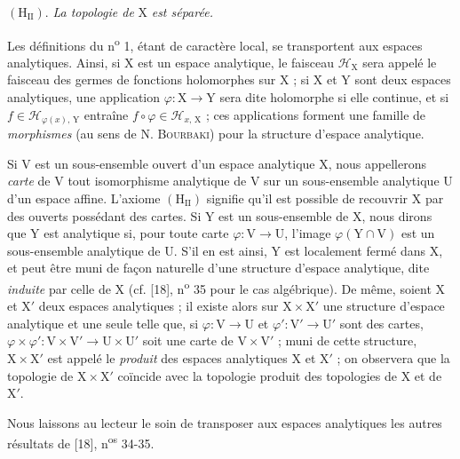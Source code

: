 $(\mathrm{H}_{\mathrm{II}})$. \emph{La topologie de} $\mathrm{X}$ \emph{est séparée.}

Les définitions du n\textsuperscript{o} 1, étant de caractère local, se transportent aux espaces analytiques. Ainsi, si $\mathrm{X}$ est un espace analytique, le faisceau $\mathcal{H}_{\mathrm{X}}$ sera appelé le faisceau des germes de fonctions holomorphes sur $\mathrm{X}$ ; si $\mathrm{X}$ et $\mathrm{Y}$ sont deux espaces analytiques, une application $\varphi : \mathrm{X} \to \mathrm{Y}$ sera dite holomorphe si elle continue, et si $f \in \mathcal{H}_{\varphi(x),\,\mathrm{Y}}$ entraîne $f \circ \varphi \in \mathcal{H}_{x,\,\mathrm{X}}$ ; ces applications forment une famille de \emph{morphismes} (au sens de N. \textsc{Bourbaki}) pour la structure d'espace analytique.



Si $\mathrm{V}$ est un sous-ensemble ouvert d'un espace analytique $\mathrm{X}$, nous appellerons \textit{carte} de $\mathrm{V}$ tout isomorphisme analytique de $\mathrm{V}$ sur un sous-ensemble analytique $\mathrm{U}$ d'un espace affine. L'axiome $(\mathrm{H}_{\mathrm{II}})$ signifie qu'il est possible de recouvrir $\mathrm{X}$ par des ouverts possédant des cartes. Si $\mathrm{Y}$ est un sous-ensemble de $\mathrm{X}$, nous dirons que $\mathrm{Y}$ est analytique si, pour toute carte $\varphi : \mathrm{V} \to \mathrm{U}$, l'image $\varphi(\mathrm{Y} \cap \mathrm{V})$ est un sous-ensemble analytique de $\mathrm{U}$. S'il en est ainsi, $\mathrm{Y}$ est localement fermé dans $\mathrm{X}$, et peut être muni de façon naturelle d'une structure d'espace analytique, dite \textit{induite} par celle de $\mathrm{X}$ (cf. [18], n\textsuperscript{o} 35 pour le cas algébrique). De même, soient $\mathrm{X}$ et $\mathrm{X}'$ deux espaces analytiques ; il existe alors sur $\mathrm{X} \times \mathrm{X}'$ une structure d'espace analytique et une seule telle que, si $\varphi : \mathrm{V} \to \mathrm{U}$ et $\varphi' : \mathrm{V}' \to \mathrm{U}'$ sont des cartes, $\varphi \times \varphi' : \mathrm{V} \times \mathrm{V}' \to \mathrm{U} \times \mathrm{U}'$ soit une carte de $\mathrm{V} \times \mathrm{V}'$ ; muni de cette structure, $\mathrm{X} \times \mathrm{X}'$ est appelé le \textit{produit} des espaces analytiques $\mathrm{X}$ et $\mathrm{X}'$ ; on observera que la topologie de $\mathrm{X} \times \mathrm{X}'$ coïncide avec la topologie produit des topologies de $\mathrm{X}$ et de $\mathrm{X}'$.

Nous laissons au lecteur le soin de transposer aux espaces analytiques les autres résultats de [18], n\textsuperscript{os} 34-35.


